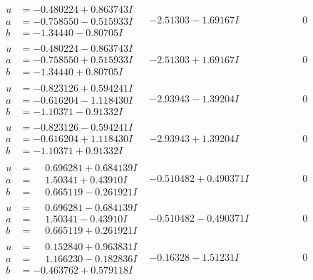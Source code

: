 \documentclass[1p]{elsarticle_modified}
\theoremstyle{definition}
\begin{document}
$$\begin{array}{c|c|c}
\begin{aligned}
u &= -0.480224 + 0.863743 I \\
a &= -0.758550 - 0.515933 I \\
b &= -1.34440 - 0.80705 I\end{aligned}
 & -2.51303 - 1.69167 I & \phantom{-0.000000 } 0 \\ \hline\begin{aligned}
u &= -0.480224 - 0.863743 I \\
a &= -0.758550 + 0.515933 I \\
b &= -1.34440 + 0.80705 I\end{aligned}
 & -2.51303 + 1.69167 I & \phantom{-0.000000 } 0 \\ \hline\begin{aligned}
u &= -0.823126 + 0.594241 I \\
a &= -0.616204 - 1.118430 I \\
b &= -1.10371 - 0.91332 I\end{aligned}
 & -2.93943 - 1.39204 I & \phantom{-0.000000 } 0 \\ \hline\begin{aligned}
u &= -0.823126 - 0.594241 I \\
a &= -0.616204 + 1.118430 I \\
b &= -1.10371 + 0.91332 I\end{aligned}
 & -2.93943 + 1.39204 I & \phantom{-0.000000 } 0 \\ \hline\begin{aligned}
u &= \phantom{-}0.696281 + 0.684139 I \\
a &= \phantom{-}1.50341 + 0.43910 I \\
b &= \phantom{-}0.665119 - 0.261921 I\end{aligned}
 & -0.510482 + 0.490371 I & \phantom{-0.000000 } 0 \\ \hline\begin{aligned}
u &= \phantom{-}0.696281 - 0.684139 I \\
a &= \phantom{-}1.50341 - 0.43910 I \\
b &= \phantom{-}0.665119 + 0.261921 I\end{aligned}
 & -0.510482 - 0.490371 I & \phantom{-0.000000 } 0 \\ \hline\begin{aligned}
u &= \phantom{-}0.152840 + 0.963831 I \\
a &= \phantom{-}1.166230 - 0.182836 I \\
b &= -0.463762 + 0.579118 I\end{aligned}
 & -0.16328 - 1.51231 I & \phantom{-0.000000 } 0 \\ \hline\begin{aligned}

\end{aligned}
\end{array}$$
\end{document}
